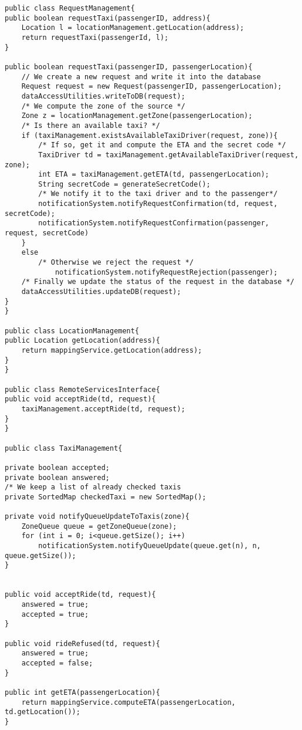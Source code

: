 \begin{lstlisting}
public class RequestManagement{ 
public boolean requestTaxi(passengerID, address){
	Location l = locationManagement.getLocation(address);
	return requestTaxi(passengerId, l);
}

public boolean requestTaxi(passengerID, passengerLocation){
	// We create a new request and write it into the database 
	Request request = new Request(passengerID, passengerLocation);
	dataAccessUtilities.writeToDB(request);
	/* We compute the zone of the source */
	Zone z = locationManagement.getZone(passengerLocation);
	/* Is there an available taxi? */
	if (taxiManagement.existsAvailableTaxiDriver(request, zone)){
		/* If so, get it and compute the ETA and the secret code */
		TaxiDriver td = taxiManagement.getAvailableTaxiDriver(request, zone);
		int ETA = taxiManagement.getETA(td, passengerLocation);
		String secretCode = generateSecretCode();
		/* We notify it to the taxi driver and to the passenger*/
		notificationSystem.notifyRequestConfirmation(td, request, secretCode);
		notificationSystem.notifyRequestConfirmation(passenger, request, secretCode)
	}
	else
		/* Otherwise we reject the request */
			notificationSystem.notifyRequestRejection(passenger);
	/* Finally we update the status of the request in the database */
	dataAccessUtilities.updateDB(request);	
}
}

public class LocationManagement{
public Location getLocation(address){
	return mappingService.getLocation(address);
}
}

public class RemoteServicesInterface{
public void acceptRide(td, request){
	taxiManagement.acceptRide(td, request);
}
}

public class TaxiManagement{

private boolean accepted;
private boolean answered;
/* We keep a list of already checked taxis 
private SortedMap checkedTaxi = new SortedMap();

private void notifyQueueUpdateToTaxis(zone){
	ZoneQueue queue = getZoneQueue(zone);
	for (int i = 0; i<queue.getSize(); i++)
		notificationSystem.notifyQueueUpdate(queue.get(n), n, queue.getSize());
}


public void acceptRide(td, request){
	answered = true;
	accepted = true;
}

public void rideRefused(td, request){
	answered = true;
	accepted = false;
}

public int getETA(passengerLocation){
	return mappingService.computeETA(passengerLocation, td.getLocation());
}


\end{lstlisting}
